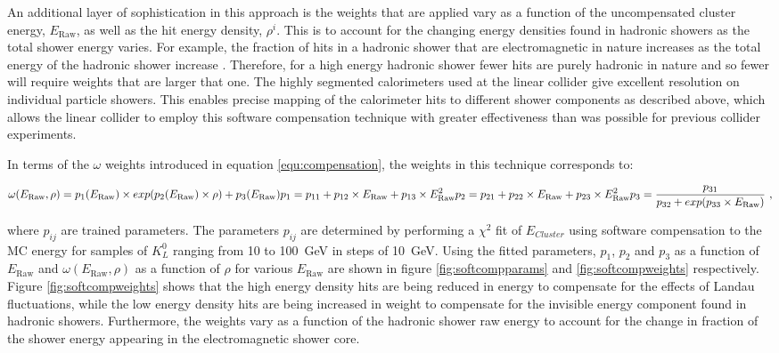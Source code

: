 An additional layer of sophistication in this approach is the weights that are applied vary as a function of the uncompensated cluster energy, $E_{\text{Raw}}$, as well as the hit energy density, $\rho^{i}$.  This is to account for the changing energy densities found in hadronic showers as the total shower energy varies.  For example, the fraction of hits in a hadronic shower that are electromagnetic in nature increases as the total energy of the hadronic shower increase \cite{Wigmans:2000vf}.  Therefore, for a high energy hadronic shower fewer hits are purely hadronic in nature and so fewer will require weights that are larger that one.  The highly segmented calorimeters used at the linear collider give excellent resolution on individual particle showers.  This enables precise mapping of the calorimeter hits to different shower components as described above, which allows the linear collider to employ this software compensation technique with greater effectiveness than was possible for previous collider experiments.  

In terms of the $\omega$ weights introduced in equation \ref{equ:compensation}, the weights \cite{Adloff:2012gv} in this technique corresponds to: 

\begin{equation}
\omega(E_{\text{Raw}}, \rho) = p_{1}(E_{\text{Raw}}) \times exp(p_{2}(E_{\text{Raw}}) \times \rho) + p_{3}(E_{\text{Raw}}) \\
p_{1} = p_{11} + p_{12} \times E_{\text{Raw}} + p_{13} \times E_{\text{Raw}}^{2} \\
p_{2} = p_{21} + p_{22} \times E_{\text{Raw}} + p_{23} \times E_{\text{Raw}}^{2} \\
p_{3} = \frac{p_{31}}{p_{32} + exp(p_{33} \times E_{\text{Raw}})}\text{ ,}
\label{equ:softcompweight}
\end{equation}

\noindent where $p_{ij}$ are trained parameters.  The parameters $p_{ij}$ are determined by performing a $\chi^{2}$ fit of $E_{Cluster}$ using software compensation to the MC energy for samples of $K^{0}_{L}$ ranging from 10 to 100~GeV in steps of 10~GeV.  Using the fitted parameters, $p_{1}$, $p_{2}$ and $p_{3}$ as a function of $E_{\text{Raw}}$ and $\omega(E_{\text{Raw}}, \rho)$ as a function of $\rho$ for various $E_{\text{Raw}}$ are shown in figure \ref{fig:softcompparams} and \ref{fig:softcompweights} respectively.  Figure \ref{fig:softcompweights} shows that the high energy density hits are being reduced in energy to compensate for the effects of Landau fluctuations, while the low energy density hits are being increased in weight to compensate for the invisible energy component found in hadronic showers.  Furthermore, the weights vary as a function of the hadronic shower raw energy to account for the change in fraction of the shower energy appearing in the electromagnetic shower core.  

